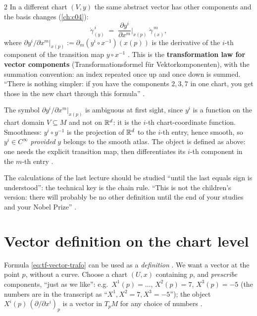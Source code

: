 \begin{paracol}{2}
In a different chart $(V,y)$ the same abstract vector has other components and the basis changes
(\cref{ch:c04}):
\begin{equation}\label{eq:tf-vector-trafo}
  \dot\gamma^{\,i}_{(y)}\;=\;\frac{\partial y^i}{\partial x^m}\Big|_{x(p)}\;\dot\gamma^{\,m}_{(x)},
\end{equation}
where $\partial y^i/\partial x^m|_{x(p)}:=\partial_m(y^i\circ x^{-1})(x(p))$ is the derivative of the $i$-th component of the
transition map $y\circ x^{-1}$ .
This is the \textbf{transformation law for vector components} (Transformationsformel für Vektorkomponenten), with the
summation convention: an index repeated once up and once down is summed. ``There is nothing simpler: if you have the
components $2,3,7$ in one chart, you get those in the new chart through this formula''
.
\begin{coursenote}
The symbol $\partial y^i/\partial x^m|_{x(p)}$ is ambiguous at first sight, since $y^i$ is a function on the chart domain
$V\subseteq M$ and not on $\mathbb{R}^d$: it is the $i$-th chart-coordinate function. Smoothness: $y^i\circ y^{-1}$ is the
projection of $\mathbb{R}^d$ to the $i$-th entry, hence smooth, so $y^i\in C^\infty$ \emph{provided} $y$ belongs to the smooth atlas. The
object is defined as above: one needs the explicit transition map, then differentiates its $i$-th component in the $m$-th
entry .
\end{coursenote}
The calculations of the last lecture should be studied ``until the last equals sign is understood'': the technical key is the
chain rule. ``This is not the children's version: there will probably be no other definition until the end of your
studies and your Nobel Prize'' .

\section{Vector definition on the chart level}\label{sec:tf-vector-def}

Formula \eqref{eq:tf-vector-trafo} can be used as a \emph{definition} . We want a
vector at the point $p$, without a curve. Choose a chart $(U,x)$ containing $p$, and \emph{prescribe} components, ``just as
we like'': e.g.\ $X^1(p)=\ldots$, $X^2(p)=7$, $X^3(p)=-5$ (the numbers are in the transcript as ``$X^1,X^2=7,X^3=-5$''); the
object $X^i(p)\,(\partial/\partial x^i)_p$ is a vector in $T_pM$ for any choice of numbers
.


\end{paracol}

